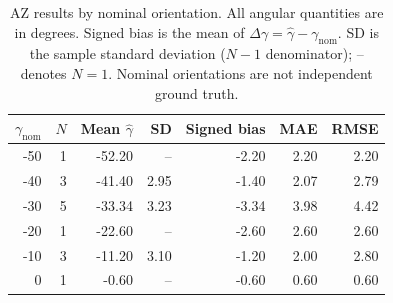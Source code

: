 \begin{table}[htbp]
\centering
\small
\caption{AZ results by nominal orientation. All angular quantities are in degrees. Signed bias is the mean of $\Delta\gamma=\hat{\gamma}-\gamma_{\mathrm{nom}}$. SD is the sample standard deviation ($N-1$ denominator); -- denotes $N=1$. Nominal orientations are not independent ground truth.}
\label{tab:az-nominal}
\begin{tabular}{rrrrrrr}
\toprule
$\gamma_{\mathrm{nom}}$ & $N$ & Mean $\hat{\gamma}$ & SD & Signed bias & MAE & RMSE \\
\midrule
-50 & 1 & -52.20 & -- & -2.20 & 2.20 & 2.20 \\
-40 & 3 & -41.40 & 2.95 & -1.40 & 2.07 & 2.79 \\
-30 & 5 & -33.34 & 3.23 & -3.34 & 3.98 & 4.42 \\
-20 & 1 & -22.60 & -- & -2.60 & 2.60 & 2.60 \\
-10 & 3 & -11.20 & 3.10 & -1.20 & 2.00 & 2.80 \\
0 & 1 & -0.60 & -- & -0.60 & 0.60 & 0.60 \\
\bottomrule
\end{tabular}
\end{table}

